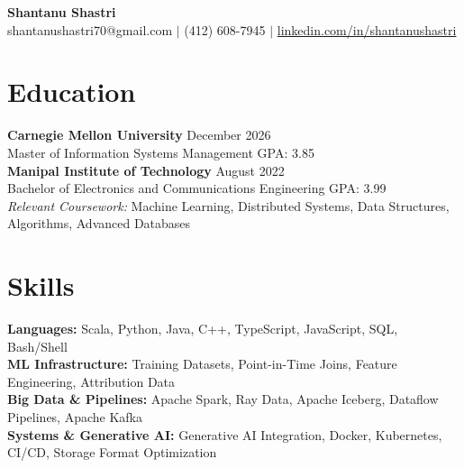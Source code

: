 \documentclass[11pt,a4paper]{article}
\begin{document}
\begin{center}
    \Huge \textbf{Shantanu Shastri} \\
    \vspace{2pt}
    \small shantanushastri70@gmail.com $|$ (412) 608-7945 $|$ \href{https://linkedin.com/in/shantanushastri}{linkedin.com/in/shantanushastri}
\end{center}

\vspace{-5pt}
\section{Education}
\noindent
\textbf{Carnegie Mellon University} \hfill December 2026 \\
Master of Information Systems Management \hfill GPA: 3.85 \\
\textbf{Manipal Institute of Technology} \hfill August 2022 \\
Bachelor of Electronics and Communications Engineering \hfill GPA: 3.99 \\
\textit{Relevant Coursework:} Machine Learning, Distributed Systems, Data Structures, Algorithms, Advanced Databases

\vspace{-5pt}
\section{Skills}
\noindent
\textbf{Languages:} Scala, Python, Java, C++, TypeScript, JavaScript, SQL, Bash/Shell \\
\textbf{ML Infrastructure:} Training Datasets, Point-in-Time Joins, Feature Engineering, Attribution Data \\
\textbf{Big Data \& Pipelines:} Apache Spark, Ray Data, Apache Iceberg, Dataflow Pipelines, Apache Kafka \\
\textbf{Systems \& Generative AI:} Generative AI Integration, Docker, Kubernetes, CI/CD, Storage Format Optimization

\vspace{-5pt}
\end{document}
